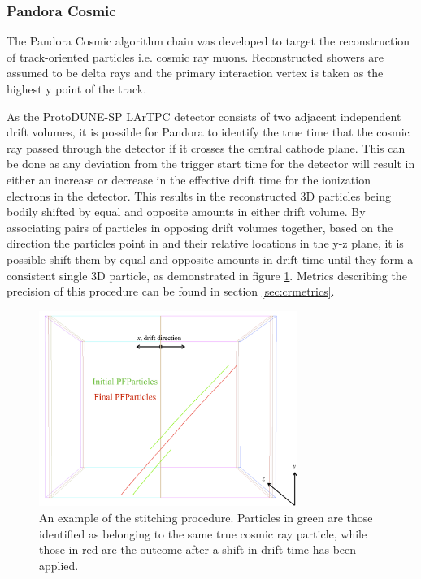 
\subsubsection{Pandora Cosmic}

The Pandora Cosmic algorithm chain \cite{pandorauboone} was developed to target the reconstruction of track-oriented particles i.e. cosmic ray muons.  Reconstructed showers are assumed to be delta rays and the primary interaction vertex is taken as the highest y point of the track.

As the ProtoDUNE-SP LArTPC detector consists of two adjacent independent drift volumes, it is possible for Pandora to identify the true time that the cosmic ray passed through the detector if it crosses the central cathode plane.  This can be done as any deviation from the trigger start time for the detector will result in either an increase or decrease in the effective drift time for the ionization electrons in the detector.  This results in the reconstructed 3D particles being bodily shifted by equal and opposite amounts in either drift volume.  By associating pairs of particles in opposing drift volumes together, based on the direction the particles point in and their relative locations in the y-z plane, it is possible shift them by equal and opposite amounts in drift time until they form a consistent single 3D particle, as demonstrated in figure \ref{fig:stitching}.  Metrics describing the precision of this procedure can be found in section \ref{sec:crmetrics}.

\begin{figure}
\centering
\includegraphics[width=0.75\textwidth]{Figures/EventDisplays/Stitching/StitchingExample.pdf}
\caption{An example of the stitching procedure.  Particles in green are those identified as belonging to the same true cosmic ray particle, while those in red are the outcome after a shift in drift time has been applied.}
\label{fig:stitching}
\end{figure}

